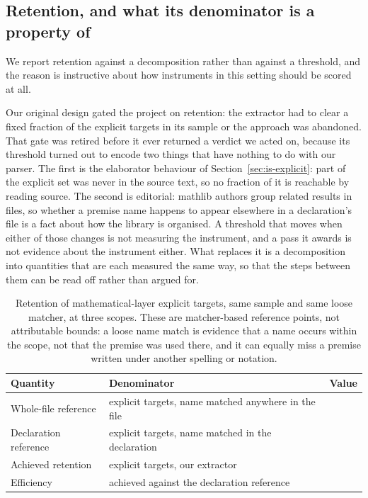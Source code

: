 
\subsection{Retention, and what its denominator is a property of}
\label{sec:retention}

We report retention against a decomposition rather than against a threshold,
and the reason is instructive about how instruments in this setting should be
scored at all.

Our original design gated the project on retention: the extractor had to clear
a fixed fraction of the explicit targets in its sample or the approach was
abandoned. That gate was retired before it ever returned a verdict we acted on,
because its threshold turned out to encode two things that have nothing to do
with our parser. The first is the elaborator behaviour of
Section~\ref{sec:is-explicit}: part of the explicit set was never in the source
text, so no fraction of it is reachable by reading source. The second is
editorial: mathlib authors group related results in files, so whether a premise
name happens to appear elsewhere in a declaration's file is a fact about how the
library is organised. A threshold that moves when either of those changes is not
measuring the instrument, and a pass it awards is not evidence about the
instrument either. What replaces it is a decomposition into quantities that
are each measured the same way, so that the steps between them can be read
off rather than argued for.

\begin{table}[h]
\centering
\caption{Retention of mathematical-layer explicit targets, same sample and same
loose matcher, at three scopes. These are matcher-based reference points, not
attributable bounds: a loose name match is evidence that a name occurs within
the scope, not that the premise was used there, and it can equally miss a
premise written under another spelling or notation.}
\label{tab:retention}
\small
\begin{tabular}{llc}
\toprule
Quantity & Denominator & Value \\
\midrule
Whole-file reference   & explicit targets, name matched anywhere in the file & \ceilingWholeFile{} \\
Declaration reference  & explicit targets, name matched in the declaration   & \reachableBound{} \\
Achieved retention     & explicit targets, our extractor                     & \retention{} \\
Efficiency             & achieved against the declaration reference          & \efficiencyReachable{} \\
\bottomrule
\end{tabular}
\end{table}

